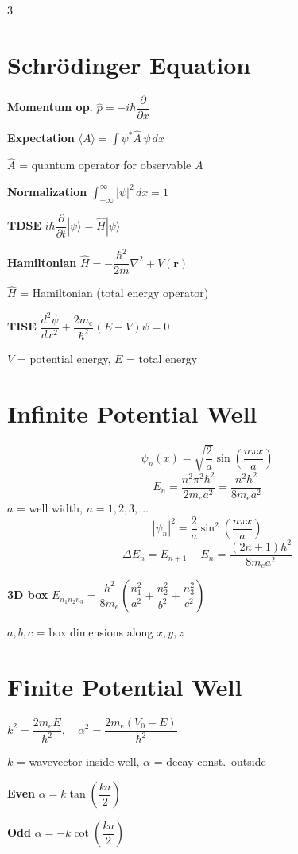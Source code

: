 \documentclass[9pt]{extarticle}
\newcommand{\eqlabel}[1]{\textbf{\scriptsize #1}\;}
\newcommand{\vardef}[1]{{\footnotesize\color{defgray}#1}}
\begin{document}
\begin{multicols}{3}
\section{Schr\"odinger Equation}
\eqlabel{Momentum op.}
$\hat{p} = -i\hbar\dfrac{\partial}{\partial x}$

\eqlabel{Expectation}
$\langle A \rangle = \displaystyle\int \psi^* \hat{A}\,\psi\,dx$

\vardef{$\hat{A}$ = quantum operator for observable $A$}

\eqlabel{Normalization}
$\displaystyle\int_{-\infty}^{\infty}|\psi|^2\,dx = 1$

\eqlabel{TDSE}
$i\hbar\dfrac{\partial}{\partial t}|\psi\rangle = \hat{H}|\psi\rangle$

\eqlabel{Hamiltonian}
$\hat{H} = -\dfrac{\hbar^2}{2m}\nabla^2 + V(\mathbf{r})$

\vardef{$\hat{H}$ = Hamiltonian (total energy operator)}

\eqlabel{TISE}
$\dfrac{d^2\psi}{dx^2} + \dfrac{2m_e}{\hbar^2}(E - V)\psi = 0$

\vardef{$V$ = potential energy, $E$ = total energy}

\section{Infinite Potential Well}
\[\psi_n(x) = \sqrt{\frac{2}{a}}\sin\!\left(\frac{n\pi x}{a}\right)\]
\[E_n = \frac{n^2\pi^2\hbar^2}{2m_ea^2} = \frac{n^2 h^2}{8m_ea^2}\]
\vardef{$a$ = well width, $n = 1,2,3,\ldots$}
\[|\psi_n|^2 = \frac{2}{a}\sin^2\!\left(\frac{n\pi x}{a}\right)\]
\[\Delta E_n = E_{n+1} - E_n = \frac{(2n+1)h^2}{8m_ea^2}\]

\eqlabel{3D box}
$E_{n_1n_2n_3} = \dfrac{h^2}{8m_e}\!\left(\dfrac{n_1^2}{a^2}+\dfrac{n_2^2}{b^2}+\dfrac{n_3^2}{c^2}\right)$

\vardef{$a,b,c$ = box dimensions along $x,y,z$}

\section{Finite Potential Well}
$k^2 = \dfrac{2m_eE}{\hbar^2},\quad \alpha^2 = \dfrac{2m_e(V_0-E)}{\hbar^2}$

\vardef{$k$ = wavevector inside well, $\alpha$ = decay const.\ outside}

\eqlabel{Even} $\alpha = k\tan\!\left(\dfrac{ka}{2}\right)$

\eqlabel{Odd} $\alpha = -k\cot\!\left(\dfrac{ka}{2}\right)$


\end{multicols}
\end{document}
